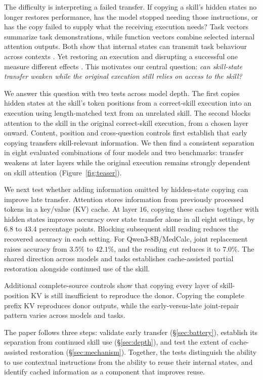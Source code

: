The difficulty is interpreting a failed transfer. If copying a skill's
hidden states no longer restores performance, has the model stopped
needing those instructions, or has the copy failed to supply what the
receiving execution needs? Task vectors summarize task demonstrations,
while function vectors combine selected internal attention outputs.
Both show that internal states can transmit task behaviour across contexts
\citep{hendel2023taskvectors,todd2024functionvectors}. Yet restoring an
execution and disrupting a successful one measure different effects
\citep{heimersheim2024patching}. This motivates our central question:
\emph{can skill-state transfer weaken while the original execution still
relies on access to the skill?}

We answer this question with two tests across model depth. The first
copies hidden states at the skill's token positions from a correct-skill
execution into an execution using length-matched text from an unrelated skill. The
second blocks attention to the skill in the original correct-skill
execution, from a chosen layer onward. Content, position and cross-question
controls first establish that early copying transfers skill-relevant
information. We then find a consistent separation in eight evaluated
combinations of four models and two benchmarks: transfer weakens at later
layers while the original execution remains strongly dependent on skill
attention (Figure~\ref{fig:teaser}).

We next test whether adding information omitted by hidden-state copying
can improve late transfer. Attention stores information from previously
processed tokens in a key/value (KV) cache. At layer $16$, copying these
caches together with hidden states improves accuracy over state transfer
alone in all eight settings, by $6.8$ to $43.4$ percentage points.
Blocking subsequent skill reading reduces the recovered accuracy in each
setting. For Qwen3-8B/MedCalc, joint replacement raises accuracy from
$3.5\%$ to $42.1\%$, and the reading cut reduces it to $7.0\%$.
The shared direction across models and tasks establishes cache-assisted
partial restoration alongside continued use of the skill.

Additional complete-source controls show that copying every layer of skill-position KV is still insufficient to reproduce the donor. Copying the complete prefix KV reproduces donor outputs, while the early-versus-late joint-repair pattern varies across models and tasks.

The paper follows three steps: validate early transfer
(\S\ref{sec:battery}), establish its separation from continued skill use
(\S\ref{sec:depth}), and test the extent of cache-assisted restoration
(\S\ref{sec:mechanism}). Together, the tests distinguish the ability to
use contextual instructions from the ability to reuse their internal
states, and identify cached information as a component that improves reuse.
